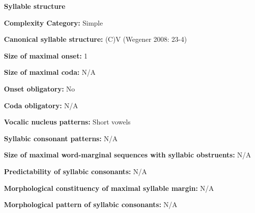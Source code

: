 \begin{styleBody}
\textbf{Syllable structure}
\end{styleBody}

\begin{styleBody}
\textbf{Complexity Category:} Simple
\end{styleBody}

\begin{styleBody}
\textbf{Canonical syllable structure:} (C)V\textbf{ }(Wegener 2008: 23-4)
\end{styleBody}

\begin{styleBody}
\textbf{Size of maximal onset:} 1
\end{styleBody}

\begin{styleBody}
\textbf{Size of maximal coda:} N/A
\end{styleBody}

\begin{styleBody}
\textbf{Onset obligatory:} No
\end{styleBody}

\begin{styleBody}
\textbf{Coda obligatory:} N/A
\end{styleBody}

\begin{styleBody}
\textbf{Vocalic nucleus patterns:} Short vowels
\end{styleBody}

\begin{styleBody}
\textbf{Syllabic consonant patterns:} N/A
\end{styleBody}

\begin{styleBody}
\textbf{Size of maximal word{}-marginal sequences with syllabic obstruents:} N/A
\end{styleBody}

\begin{styleBody}
\textbf{Predictability of syllabic consonants:} N/A
\end{styleBody}

\begin{styleBody}
\textbf{Morphological constituency of maximal syllable margin:} N/A
\end{styleBody}

\begin{styleBody}
\textbf{Morphological pattern of syllabic consonants:} N/A
\end{styleBody}

